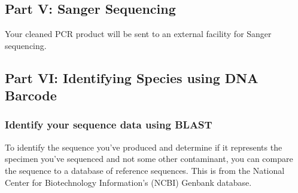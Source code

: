 \documentclass[
  letterpaper,
  DIV=11,
  numbers=noendperiod]{scrreprt}
\begin{document}
\subsection*{Part V: Sanger Sequencing}\label{part-v-sanger-sequencing}

Your cleaned PCR product will be sent to an external facility for Sanger
sequencing.

\subsection*{Part VI: Identifying Species using DNA
Barcode}\label{part-vi-identifying-species-using-dna-barcode}

\subsubsection*{Identify your sequence data using
BLAST}\label{identify-your-sequence-data-using-blast}

To identify the sequence you've produced and determine if it represents
the specimen you've sequenced and not some other contaminant, you can
compare the sequence to a database of reference sequences. This is from
the National Center for Biotechnology Information's (NCBI) Genbank
database.
\end{document}
